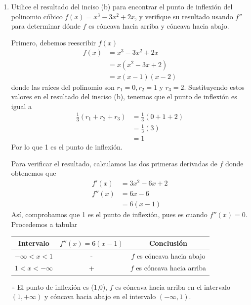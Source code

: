 \documentclass[12pt]{article}
\begin{document}
\begin{enumerate}[label=(\alph*)]
\item Utilice el resultado del inciso (b) para encontrar el punto de inflexión del polinomio cúbico $f(x) = x^3-3x^2 + 2x$, y verifique su resultado usando $f''$ para determinar dónde $f$ es cóncava hacia arriba y cóncava hacia abajo.

  Primero, debemos reescribir $f(x)$
  \begin{align*}
    f(x)
    &= x^3-3x^2 + 2x\\
    &=x(x^2-3x+2)\\
    &=x(x-1)(x-2)
  \end{align*}
  donde las raíces del polinomio son $r_1=0,r_2=1$ y $r_3=2$. Sustituyendo estos valores en el resultado del insciso (b), tenemos que el punto de inflexión es igual a
  \begin{align*}
    \frac{1}{3}(r_1+r_2+r_3)
    &= \frac{1}{3}(0+1+2) \\
    &= \frac{1}{3}(3) \\
    &= 1
  \end{align*}
  Por lo que 1 es el punto de inflexión.

  Para verificar el resultado, calculamos las dos primeras derivadas de $f$ donde obtenemos que
  \begin{align*}
    f'(x)
    &= 3x^2 - 6x +2\\
    f''(x)
    &= 6x -6 \\
    &= 6 (x-1)
  \end{align*}
  Así, comprobamos que 1 es el punto de inflexión, pues es cuando $f''(x)=0$. Procedemos a tabular
  \begin{table}[H]
    \centering
    \begin{tabular}{c|c|c}
      \hline
      Intervalo & $f''(x) = 6(x-1)$ & Conclusión \\
      \hline
      $-\infty<x<1$ & - & $f$ es cóncava hacia abajo \\
      $1<x<-\infty$ & + & $f$ es cóncava hacia arriba \\
      \hline
    \end{tabular}
  \end{table}
  $\therefore $ El punto de inflexión es (1,0), $f$ es cóncava hacia arriba en el intervalo $(1,+\infty)$ y cóncava hacia abajo en el intervalo $(-\infty,1)$.
  
\end{enumerate}

\end{document}
